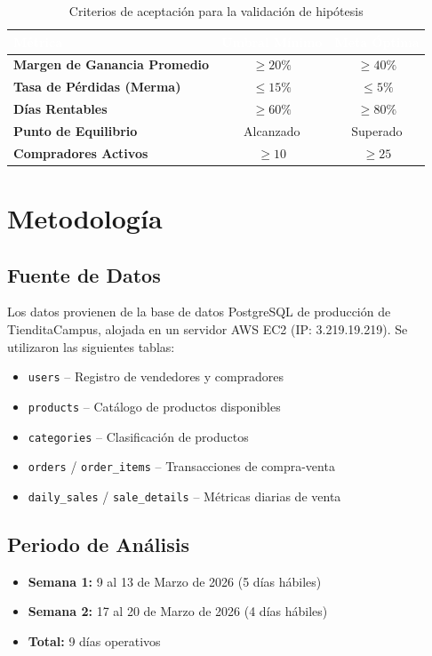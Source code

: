 \documentclass[12pt, a4paper]{article}
\begin{document}
\begin{table}[H]
\centering
\caption{Criterios de aceptación para la validación de hipótesis}
\begin{tabular}{>{\bfseries}l c c}
\toprule
\rowcolor{tableheader}
\textcolor{white}{\textbf{Métrica}} & \textcolor{white}{\textbf{Umbral Mínimo}} & \textcolor{white}{\textbf{Meta Óptima}} \\
\midrule
Margen de Ganancia Promedio & $\geq 20\%$ & $\geq 40\%$ \\
\rowcolor{rowalt}
Tasa de Pérdidas (Merma) & $\leq 15\%$ & $\leq 5\%$ \\
Días Rentables & $\geq 60\%$ & $\geq 80\%$ \\
\rowcolor{rowalt}
Punto de Equilibrio & Alcanzado & Superado \\
Compradores Activos & $\geq 10$ & $\geq 25$ \\
\bottomrule
\end{tabular}
\end{table}

\section{Metodología}

\subsection{Fuente de Datos}
Los datos provienen de la base de datos PostgreSQL de producción de TienditaCampus, alojada en un servidor AWS EC2 (IP: 3.219.19.219). Se utilizaron las siguientes tablas:

\begin{itemize}
    \item \texttt{users} -- Registro de vendedores y compradores
    \item \texttt{products} -- Catálogo de productos disponibles
    \item \texttt{categories} -- Clasificación de productos
    \item \texttt{orders} / \texttt{order\_items} -- Transacciones de compra-venta
    \item \texttt{daily\_sales} / \texttt{sale\_details} -- Métricas diarias de venta
\end{itemize}

\subsection{Periodo de Análisis}
\begin{itemize}
    \item \textbf{Semana 1:} 9 al 13 de Marzo de 2026 (5 días hábiles)
    \item \textbf{Semana 2:} 17 al 20 de Marzo de 2026 (4 días hábiles)
    \item \textbf{Total:} 9 días operativos
\end{itemize}
\end{document}
